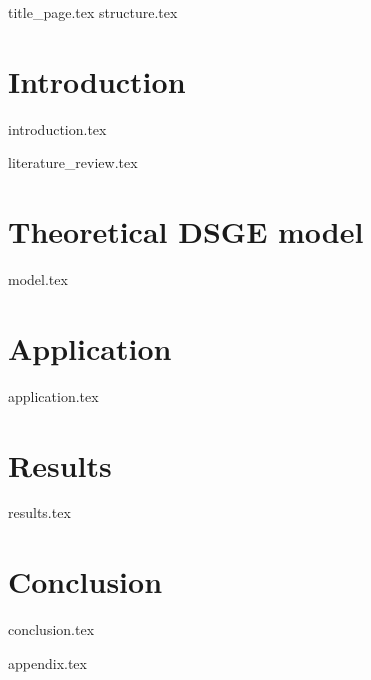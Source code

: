 \documentclass[12pt]{article}
\begin{document}
\begin{sloppypar}
{title_page.tex}
\pagebreak
{structure.tex}
\pagebreak
{}

\section{Introduction}
{introduction.tex}
\newpage

{literature_review.tex}
\newpage

\section{Theoretical DSGE model}
{model.tex}
\newpage

\section{Application} \label{application}
{application.tex}
\newpage

\section{Results}
{results.tex}
\newpage

\section{Conclusion}
{conclusion.tex}
\newpage

\printbibliography
\newpage

{appendix.tex}

\end{sloppypar}
\end{document}
